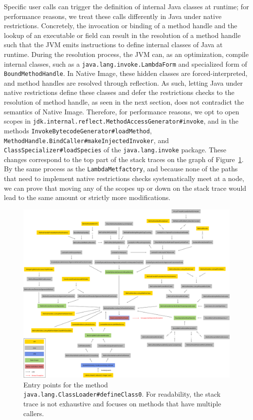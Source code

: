 Specific user calls can trigger the definition of internal Java classes at runtime; for performance reasons, we treat these calls differently in Java under native restrictions.
Concretely, the invocation or binding of a method handle and the lookup of an executable or field can result in the resolution of a method handle such that the JVM emits instructions to define internal classes of Java at runtime. During the resolution process, the JVM can, as an optimization, compile internal classes, such as a \verb|java.lang.invoke.LambdaForm| and specialized form of \verb|BoundMethodHandle|.
In Native Image, these hidden classes are forced-interpreted, and method handles are resolved through reflection. As such, letting Java under native restrictions define these classes and defer the restrictions checks to the resolution of method handle, as seen in the next section, does not contradict the semantics of Native Image. Therefore, for performance reasons, we opt to open scopes in \verb|jdk.internal.reflect.MethodAccessGenerator#invoke|, and in the methods \verb|InvokeBytecodeGenerator#loadMethod|, \verb|MethodHandle.BindCaller#makeInjectedInvoker|, and \verb|ClassSpecializer#loadSpecies| of the \verb|java.lang.invoke| package. These changes correspond to the top part of the stack traces on the graph of Figure~\ref{fig:define_class_0}. By the same process as the \verb|LambdaMetfactory|, and because none of the paths that need to implement native restrictions checks systematically meet at a node, we can prove that moving any of the scopes up or down on the stack trace would lead to the same amount or strictly more modifications.

\begin{figure}
    \centering
    \includegraphics[angle=90,origin=c,scale=0.35]{resources/Group 413.png}
    \caption{Entry points for the method \texttt{java.lang.ClassLoader\#defineClass0}. For readability, the stack trace is not exhaustive and focuses on methods that have multiple callers.}
    \label{fig:define_class_0}
\end{figure}


